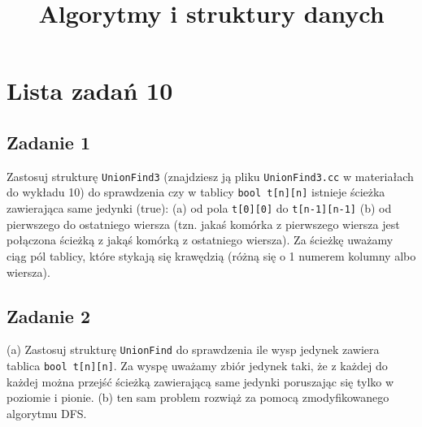 \documentclass{article}
\begin{document}
\title{Algorytmy i struktury danych}
\author{}
\date{}
\maketitle

\section*{Lista zadań 10}

\subsection*{Zadanie 1}
Zastosuj strukturę \verb|UnionFind3| (znajdziesz ją pliku \verb|UnionFind3.cc| w materiałach do wykładu 10)
do sprawdzenia czy w tablicy \verb|bool t[n][n]| istnieje ścieżka zawierająca same
jedynki (true): (a) od pola \verb|t[0][0]| do \verb|t[n-1][n-1]| (b) od pierwszego do ostatniego
wiersza (tzn. jakaś komórka z pierwszego wiersza jest połączona ścieżką z jakąś komórką
z ostatniego wiersza). Za ścieżkę uważamy ciąg pól tablicy, które stykają się krawędzią
(różną się o 1 numerem kolumny albo wiersza).

\subsection*{Zadanie 2}
(a) Zastosuj strukturę \verb|UnionFind| do sprawdzenia ile wysp jedynek zawiera tablica
\verb|bool t[n][n]|. Za wyspę uważamy zbiór jedynek taki, że z każdej do każdej można
przejść ścieżką zawierającą same jedynki poruszając się tylko w poziomie i pionie.
(b) ten sam problem rozwiąż za pomocą zmodyfikowanego algorytmu DFS.
\end{document}
